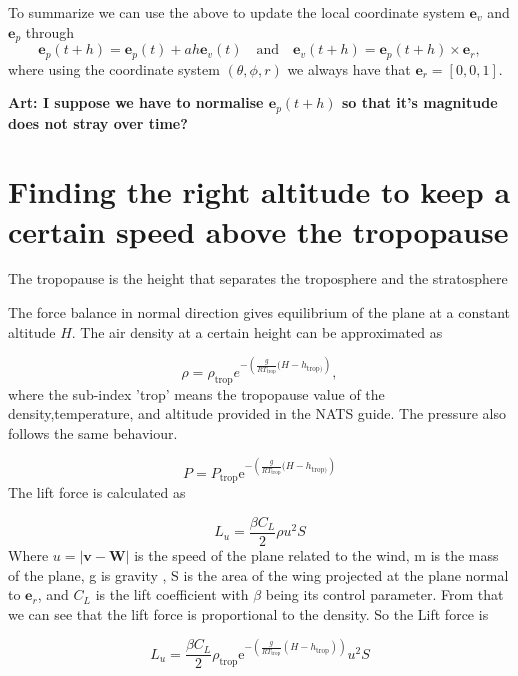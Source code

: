 \documentclass{article}
\renewcommand{\vec}[1]{\boldsymbol{#1}}
\begin{document}
To summarize we can use the above to update the local coordinate system $\vec e_v$ and $\vec e_p$ through
\begin{equation}
    \vec e_p(t+h) = \vec e_p(t) + a h \vec e_v(t) \quad \text{and} \quad 
    \vec e_v(t+h) = \vec e_p(t+h) \times \vec e_r,
\end{equation}
where using the coordinate system $(\theta,\phi,r)$ we always have that $\vec e_r = [0,0,1]$.

\textbf{Art: I suppose we have to normalise $\vec e_p(t+h) $ so that it's magnitude does not stray over time?}


\section{Finding the right altitude to keep a certain speed above the tropopause}

The tropopause is the height that separates the troposphere and the stratosphere 

The force balance in normal direction gives equilibrium of the plane at a constant altitude $H$. 
The air density at a certain height can be approximated as

\begin{equation}
    \rho= \rho_{\text{trop}}e^{-\left( \frac{g}{RT_{\text{trop}}}(H-h_{\text{trop})} \right)},
\end{equation}
where the sub-index 'trop' means the tropopause value of the density,temperature, and altitude provided in the NATS guide. The pressure also follows the same behaviour.

\begin{equation}
    P= P_{\text{trop}}\mathrm{e}^{-\left( \frac{g}{RT_{\text{trop}}}(H-h_{\text{trop})} \right)}
\end{equation}
The lift force is calculated as

\begin{equation}
    L_u= \frac{\beta C_L}{2} \rho u^2S
\end{equation}
Where $u=|\vec{v}-\vec{W}|$ is the speed of the plane related to the wind, m is the mass of the plane, g is gravity , S is the area of the wing  projected at the plane normal to $\vec{e}_r$, and $C_L$ is the lift coefficient with $\beta$ being its control parameter. From that we can see that the lift force is proportional to the density.  So the Lift force is 

\begin{equation}
    L_u= \frac{\beta C_L}{2} \rho_{\text{trop}}\mathrm{e}^{-\left( \frac{g}{RT_{\text{trop}}}(H-h_{\text{trop}}) \right)} u^2S
\end{equation}
\end{document}
